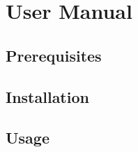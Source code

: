 %
%

\chapter{User Manual}
\label{app:manual}

\section*{Prerequisites}

\section*{Installation}

\section*{Usage}
